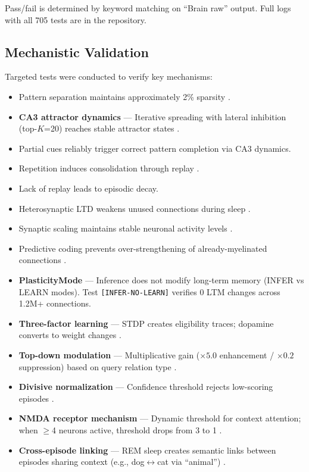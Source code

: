 \documentclass[11pt]{article}
\begin{document}
\noindent Pass/fail is determined by keyword matching on ``Brain raw'' output. Full logs with all 705 tests are in the repository.

\subsection{Mechanistic Validation}

Targeted tests were conducted to verify key mechanisms:

\begin{itemize}
\item Pattern separation maintains approximately 2\% sparsity \citep{rolls2007attractor}.
\item \textbf{CA3 attractor dynamics} --- Iterative spreading with lateral inhibition (top-$K$=20) reaches stable attractor states \citep{rolls2013mechanisms}.
\item Partial cues reliably trigger correct pattern completion via CA3 dynamics.
\item Repetition induces consolidation through replay \citep{mcclelland1995there}.
\item Lack of replay leads to episodic decay.
\item Heterosynaptic LTD weakens unused connections during sleep \citep{rolls2013mechanisms}.
\item Synaptic scaling maintains stable neuronal activity levels \citep{turrigiano2008self}.
\item Predictive coding prevents over-strengthening of already-myelinated connections \citep{rao1999predictive}.
\item \textbf{PlasticityMode} --- Inference does not modify long-term memory (INFER vs LEARN modes). Test \texttt{[INFER-NO-LEARN]} verifies 0 LTM changes across 1.2M+ connections.
\item \textbf{Three-factor learning} --- STDP creates eligibility traces; dopamine converts to weight changes \citep{gerstner2018eligibility}.
\item \textbf{Top-down modulation} --- Multiplicative gain ($\times 5.0$ enhancement / $\times 0.2$ suppression) based on query relation type \citep{zanto2011causal,desimone1995neural}.
\item \textbf{Divisive normalization} --- Confidence threshold rejects low-scoring episodes \citep{carandini2012normalization}.
\item \textbf{NMDA receptor mechanism} --- Dynamic threshold for context attention; when $\geq$4 neurons active, threshold drops from 3 to 1 \citep{malenka2004ltp}.
\item \textbf{Cross-episode linking} --- REM sleep creates semantic links between episodes sharing context (e.g., dog$\leftrightarrow$cat via ``animal'') \citep{mcclelland1995there,kumaran2012inference}.
\end{itemize}
\end{document}
